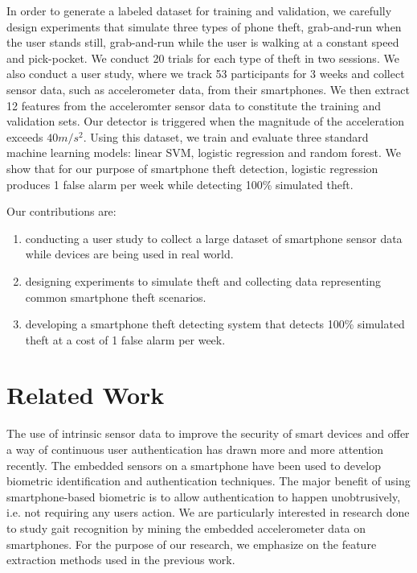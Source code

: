 \documentclass{soups}
\begin{document}
In order to generate a labeled dataset for training and validation, we carefully design experiments that simulate three types of phone theft, grab-and-run when the user stands still, grab-and-run while the user is walking at a constant speed and pick-pocket. We conduct 20 trials for each type of theft in two sessions. We also conduct a user study, where we track 53 participants for 3 weeks and collect sensor data, such as accelerometer data, from their smartphones. We then extract 12 features from the acceleromter sensor data to constitute the training and validation sets. Our detector is triggered when the magnitude of the acceleration exceeds $40m/s^2$. Using this dataset, we train and evaluate three standard machine learning models: linear SVM, logistic regression and random forest. We show that for our purpose of smartphone theft detection, logistic regression produces 1 false alarm per week while detecting 100\% simulated theft.

Our contributions are:
\begin{enumerate}
  \item conducting a user study to collect a large dataset of smartphone sensor data while devices are being used in real world.
  \item designing experiments to simulate theft and collecting data representing common smartphone theft scenarios.
  \item developing a smartphone theft detecting system that detects 100\% simulated theft at a cost of 1 false alarm per week.
\end{enumerate}




\section{Related Work}

The use of intrinsic sensor data to improve the security of smart devices and offer a way of continuous user authentication has drawn more and more attention recently. The embedded sensors on a smartphone have been used to develop biometric identification and authentication techniques. The major benefit of using smartphone-based biometric is to allow authentication to happen unobtrusively, i.e. not requiring any users action. We are particularly interested in research done to study gait recognition by mining the embedded accelerometer data on smartphones. For the purpose of our research, we emphasize on the feature extraction methods used in the previous work.
\end{document}
